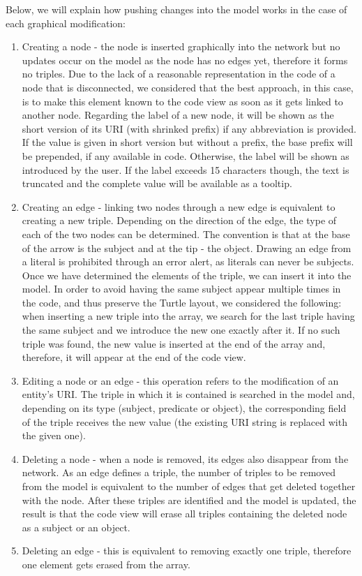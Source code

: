 Below, we will explain how pushing changes into the model works in the case of each graphical modification:

\begin{enumerate}
	\item Creating a node - the node is inserted graphically into the network but no updates occur on the model as the node has no edges yet, therefore it forms no triples. Due to the lack of a reasonable representation in the code of a node that is disconnected, we considered that the best approach, in this case, is to make this element known to the code view as soon as it gets linked to another node. Regarding the label of a new node, it will be shown as the short version of its URI (with shrinked prefix) if any abbreviation is provided. If the value is given in short version but without a prefix, the base prefix will be prepended, if any available in code. Otherwise, the label will be shown as introduced by the user. If the label exceeds 15 characters though, the text is truncated and the complete value will be available as a tooltip.
	\item Creating an edge -  linking two nodes through a new edge is equivalent to creating a new triple. Depending on the direction of the edge, the type of each of the two nodes can be determined. The convention is that at the base of the arrow is the subject and at the tip - the object. Drawing an edge from a literal is prohibited through an error alert, as literals can never be subjects. Once we have determined the elements of the triple, we can insert it into the model. In order to avoid having the same subject appear multiple times in the code, and thus preserve the Turtle layout, we considered the following: when inserting a new triple into the array, we search for the last triple having the same subject and we introduce the new one exactly after it. If no such triple was found, the new value is inserted at the end of the array and, therefore, it will appear at the end of the code view.
	\item Editing a node or an edge - this operation refers to the modification of an entity's URI. The triple in which it is contained is searched in the model and, depending on its type (subject, predicate or object), the corresponding field of the triple receives the new value (the existing URI string is replaced with the given one).
	\item Deleting a node - when a node is removed, its edges also disappear from the network. As an edge defines a triple, the number of triples to be removed from the model is equivalent to the number of edges that get deleted together with the node. After these triples are identified and the model is updated, the result is that the code view will erase all triples containing the deleted node as a subject or an object.
	\item Deleting an edge - this is equivalent to removing exactly one triple, therefore one element gets erased from the array.
\end{enumerate}

